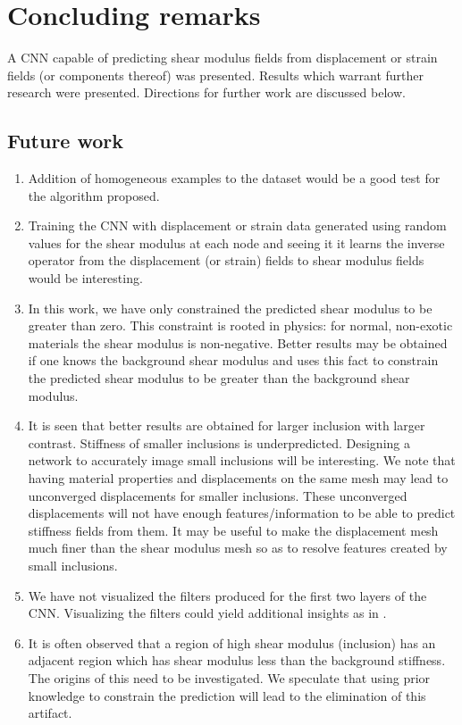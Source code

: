 \documentclass[12pt]{article}
\begin{document}
\section{Concluding remarks}
A CNN capable of predicting shear modulus fields from displacement or strain fields (or components thereof) was presented. Results which warrant further research were presented. Directions for further work are discussed below. 
\subsection{Future work}
\begin{enumerate}
\item{Addition of homogeneous examples to the dataset would be a good test for the algorithm proposed.}
\item{Training the CNN with displacement or strain data generated using random values for the shear modulus at each node and seeing it it learns the inverse operator from the displacement (or strain) fields to shear modulus fields would be interesting. }
\item{In this work, we have only constrained the predicted shear modulus to be greater than zero. This constraint is rooted in physics: for normal, non-exotic materials the shear modulus is non-negative. Better results may be obtained if one knows the background shear modulus and uses this fact to constrain the predicted shear modulus to be greater than the background shear modulus.}
\item{It is seen that better results are obtained for larger inclusion with larger contrast. Stiffness of smaller inclusions is underpredicted. Designing a network to accurately image small inclusions will be interesting. We note that having material properties and displacements on the same mesh may lead to unconverged displacements for smaller inclusions. These unconverged displacements will not have enough features/information to be able to predict stiffness fields from them. It may be useful to make the displacement mesh much finer than the shear modulus mesh so as to resolve features created by small inclusions.}
\item{We have not visualized the filters produced for the first two layers of the CNN. Visualizing the filters could yield additional insights as in \cite{paper:pateloberai2019}.}
\item{It is often observed that a region of high shear modulus (inclusion) has an adjacent region which has shear modulus less than the background stiffness. The origins of this need to be investigated. We speculate that using prior knowledge to constrain the prediction will lead to the elimination of this artifact.}

\end{enumerate}
\end{document}
